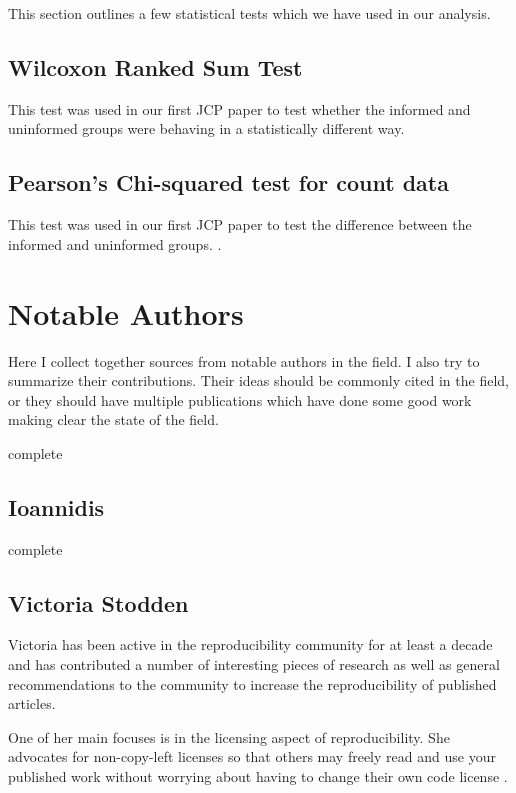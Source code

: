 \documentclass[american]{article}
\newcommand{\complete}{
	\gls{complete}
}
\begin{document}
This section outlines a few statistical tests which we have used in our analysis.

\subsection{Wilcoxon Ranked Sum Test} \label{sec:statistical-wilcoxon}

This test was used in our first JCP paper to test whether the informed and uninformed groups were behaving in a statistically different way. \cite{wilcoxon-test,R-wilcoxon-test}

\subsection{Pearson's Chi-squared test for count data} \label{sec:statistical-pearson-chisquare}

This test was used in our first JCP paper to test the difference between the informed and uninformed groups. \cite{pearson-chisquare,R-pearson-chisquare}.

\section{Notable Authors} \label{sec:authors}

Here I collect together sources from notable authors in the field. I also try to summarize their contributions. Their ideas should be commonly cited in the field, or they should have multiple publications which have done some good work making clear the state of the field.

\complete

\subsection{Ioannidis} \label{sec:authors-ioannidis}

\complete

\subsection{Victoria Stodden} \label{sec:authors-stodden}

Victoria has been active in the reproducibility community for at least a decade and has contributed a number of interesting pieces of research as well as general recommendations to the community to increase the reproducibility of published articles.

One of her main focuses is in the licensing aspect of reproducibility. She advocates for non-copy-left licenses so that others may freely read and use your published work without worrying about having to change their own code license \cite{stodden-legal-framework-reproducible-2009}.
\end{document}
